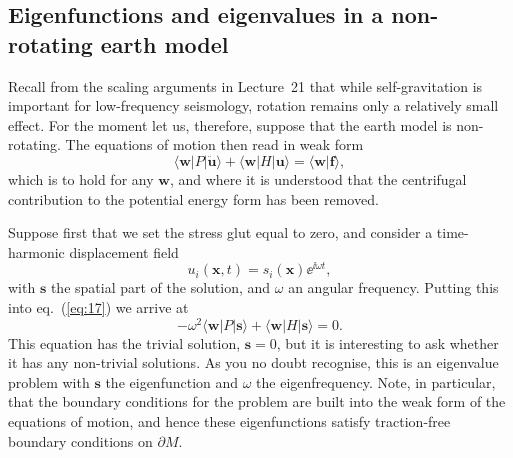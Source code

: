 \subsection*{Eigenfunctions and eigenvalues in a non-rotating earth model}
Recall from the scaling arguments in Lecture~21 that while self-gravitation is important for low-frequency seismology, rotation remains 
only a relatively small effect. For the moment let us, therefore, suppose that the earth model is non-rotating. The equations of motion then read in weak form
\begin{equation}
\langle \mathbf{w}|P|\ddot{\mathbf{u}}\rangle+\langle \mathbf{w}|H|\mathbf{u}\rangle=\langle \mathbf{w}|\mathbf{f}\rangle,
\label{eq:17}
\end{equation}
which is to hold for any $\mathbf{w}$, and where it is understood that the centrifugal contribution to the potential energy form has been removed. 

Suppose first that we set the stress glut equal to zero, and consider a time-harmonic displacement field
\begin{equation}
u_{i}(\mathbf{x},t)=s_{i}(\mathbf{x})\ee^{\ii\omega t},
\label{eq:18}
\end{equation}
with $\mathbf{s}$ the spatial part of the solution, and $\omega$ an angular frequency. Putting this into eq.~(\ref{eq:17}) we arrive at
\begin{equation}
-\omega^{2}\langle \mathbf{w}|P|\mathbf{s}\rangle+\langle \mathbf{w}|H|\mathbf{s}\rangle=0.
\label{eq:19}
\end{equation}
This equation has the trivial solution, $\mathbf{s}=0$, but it is interesting to ask whether it has any non-trivial solutions.
As you no doubt recognise, this is an eigenvalue problem with $\mathbf{s}$ the eigenfunction and $\omega$ the eigenfrequency. 
Note, in particular, that the boundary conditions for the problem are built into the weak form of the equations of motion, 
and hence these eigenfunctions satisfy traction-free boundary conditions on $\partial M$.

